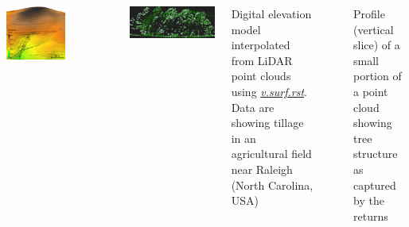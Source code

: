 \documentclass[25pt, margin=0mm, innermargin=15mm, blockverticalspace=15mm, colspace=15mm, subcolspace=8mm]{tikzposter}
\newcommand{\gmodule}[1]{\href{http://grass.osgeo.org/grass72/manuals/#1.html}{\emph{#1}}}
\begin{document}
\begin{columns}
{\centering
\begin{minipage}{0.48\linewidth}
\centering
\includegraphics[width=0.7\textwidth]{elevation_lidar}
\end{minipage}
~
\begin{minipage}{0.48\linewidth}
\centering
\includegraphics[width=\textwidth]{lidar_profile}
\end{minipage}

\bigskip

\begin{minipage}{0.48\linewidth}
\centering
Digital elevation model interpolated from LiDAR point clouds
using \gmodule{v.surf.rst}. Data are showing tillage in an agricultural field near Raleigh (North Carolina, USA)
\end{minipage}
~
\begin{minipage}{0.48\linewidth}
\centering
Profile (vertical slice) of a small portion of a point cloud showing tree structure as captured by the returns
\end{minipage}

}



\end{columns}
\end{document}
